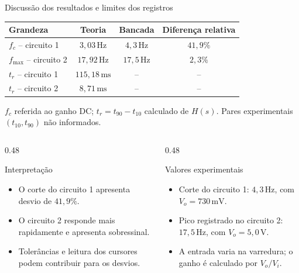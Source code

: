\begin{frame}{Discussão dos resultados e limites dos registros}
  \small
  \centering
  \renewcommand{\arraystretch}{0.98}
  \begin{tabular}{lccc}
    \toprule
    Grandeza & Teoria & Bancada & Diferença relativa \\
    \midrule
    $f_c$ -- circuito 1 & $3{,}03\,\mathrm{Hz}$ & $4{,}3\,\mathrm{Hz}$ & $41{,}9\%$ \\
    $f_{\max}$ -- circuito 2 & $17{,}92\,\mathrm{Hz}$ & $17{,}5\,\mathrm{Hz}$ & $2{,}3\%$ \\
    $t_r$ -- circuito 1 & $115{,}18\,\mathrm{ms}$ & -- & -- \\
    $t_r$ -- circuito 2 & $8{,}71\,\mathrm{ms}$ & -- & -- \\
    \bottomrule
  \end{tabular}

  \vspace{0.05cm}
  {\scriptsize $f_c$ referida ao ganho DC; $t_r=t_{90}-t_{10}$ calculado de $H(s)$.
  Pares experimentais $(t_{10},t_{90})$ não informados.\par}

  \begin{columns}[T,onlytextwidth]
    \begin{column}{0.48\textwidth}
      \begin{block}{Interpretação}
        \begin{itemize}
          \item O corte do circuito 1 apresenta desvio de $41{,}9\%$.
          \item O circuito 2 responde mais rapidamente e apresenta sobressinal.
          \item Tolerâncias e leitura dos cursores podem contribuir para os desvios.
        \end{itemize}
      \end{block}
    \end{column}
    \begin{column}{0.48\textwidth}
      \begin{alertblock}{Valores experimentais}
        \begin{itemize}
          \item Corte do circuito 1: $4{,}3\,\mathrm{Hz}$, com $V_o=730\,\mathrm{mV}$.
          \item Pico registrado no circuito 2: $17{,}5\,\mathrm{Hz}$, com $V_o=5{,}0\,\mathrm{V}$.
          \item A entrada varia na varredura; o ganho é calculado por $V_o/V_i$.
        \end{itemize}
      \end{alertblock}
    \end{column}
  \end{columns}
\end{frame}
